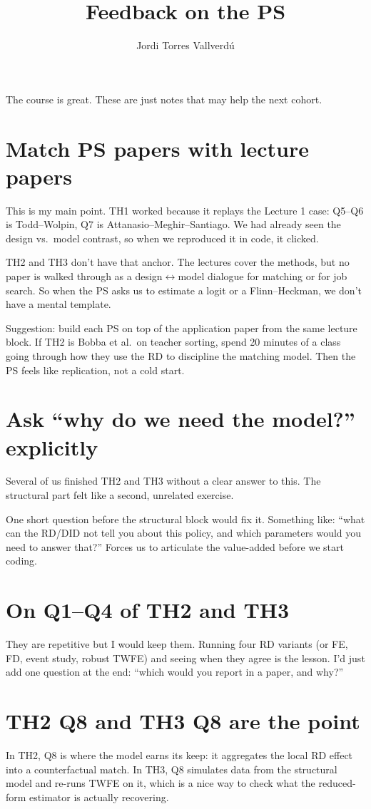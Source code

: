 \documentclass[11pt]{article}
\title{Feedback on the PS}
\author{Jordi Torres Vallverd\'u}
\date{}
\begin{document}
\maketitle

The course is great. These are just notes that may help the next cohort.

\section*{Match PS papers with lecture papers}
This is my main point. TH1 worked because it replays the Lecture 1 case: Q5--Q6 is Todd--Wolpin, Q7 is Attanasio--Meghir--Santiago. We had already seen the design vs.\ model contrast, so when we reproduced it in code, it clicked.

TH2 and TH3 don't have that anchor. The lectures cover the methods, but no paper is walked through as a design$\leftrightarrow$model dialogue for matching or for job search. So when the PS asks us to estimate a logit or a Flinn--Heckman, we don't have a mental template.

Suggestion: build each PS on top of the application paper from the same lecture block. If TH2 is Bobba et al.\ on teacher sorting, spend 20 minutes of a class going through how they use the RD to discipline the matching model. Then the PS feels like replication, not a cold start.

\section*{Ask ``why do we need the model?'' explicitly}
Several of us finished TH2 and TH3 without a clear answer to this. The structural part felt like a second, unrelated exercise.

One short question before the structural block would fix it. Something like: ``what can the RD/DID not tell you about this policy, and which parameters would you need to answer that?'' Forces us to articulate the value-added before we start coding.

\section*{On Q1--Q4 of TH2 and TH3}
They are repetitive but I would keep them. Running four RD variants (or FE, FD, event study, robust TWFE) and seeing when they agree is the lesson. I'd just add one question at the end: ``which would you report in a paper, and why?''

\section*{TH2 Q8 and TH3 Q8 are the point}
In TH2, Q8 is where the model earns its keep: it aggregates the local RD effect into a counterfactual match. In TH3, Q8 simulates data from the structural model and re-runs TWFE on it, which is a nice way to check what the reduced-form estimator is actually recovering.
\end{document}
